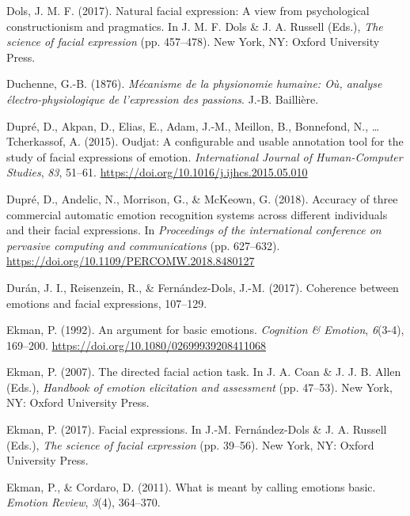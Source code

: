\documentclass[man]{apa6}
\begin{document}
\leavevmode\hypertarget{ref-dols2017natural}{}%
Dols, J. M. F. (2017). Natural facial expression: A view from psychological constructionism and pragmatics. In J. M. F. Dols \& J. A. Russell (Eds.), \emph{The science of facial expression} (pp. 457--478). New York, NY: Oxford University Press.

\leavevmode\hypertarget{ref-duchenne1876mecanisme}{}%
Duchenne, G.-B. (1876). \emph{Mécanisme de la physionomie humaine: Où, analyse électro-physiologique de l'expression des passions}. J.-B. Baillière.

\leavevmode\hypertarget{ref-dupre2015oudjat}{}%
Dupré, D., Akpan, D., Elias, E., Adam, J.-M., Meillon, B., Bonnefond, N., \ldots{} Tcherkassof, A. (2015). Oudjat: A configurable and usable annotation tool for the study of facial expressions of emotion. \emph{International Journal of Human-Computer Studies}, \emph{83}, 51--61. \url{https://doi.org/10.1016/j.ijhcs.2015.05.010}

\leavevmode\hypertarget{ref-dupre2018accuracy}{}%
Dupré, D., Andelic, N., Morrison, G., \& McKeown, G. (2018). Accuracy of three commercial automatic emotion recognition systems across different individuals and their facial expressions. In \emph{Proceedings of the international conference on pervasive computing and communications} (pp. 627--632). \url{https://doi.org/10.1109/PERCOMW.2018.8480127}

\leavevmode\hypertarget{ref-duran2017coherence}{}%
Durán, J. I., Reisenzein, R., \& Fernández-Dols, J.-M. (2017). Coherence between emotions and facial expressions, 107--129.

\leavevmode\hypertarget{ref-ekman1992argument}{}%
Ekman, P. (1992). An argument for basic emotions. \emph{Cognition \& Emotion}, \emph{6}(3-4), 169--200. \url{https://doi.org/10.1080/02699939208411068}

\leavevmode\hypertarget{ref-ekman2007directed}{}%
Ekman, P. (2007). The directed facial action task. In J. A. Coan \& J. J. B. Allen (Eds.), \emph{Handbook of emotion elicitation and assessment} (pp. 47--53). New York, NY: Oxford University Press.

\leavevmode\hypertarget{ref-ekman2017facial}{}%
Ekman, P. (2017). Facial expressions. In J.-M. Fernández-Dols \& J. A. Russell (Eds.), \emph{The science of facial expression} (pp. 39--56). New York, NY: Oxford University Press.

\leavevmode\hypertarget{ref-ekman2011meant}{}%
Ekman, P., \& Cordaro, D. (2011). What is meant by calling emotions basic. \emph{Emotion Review}, \emph{3}(4), 364--370.
\end{document}
